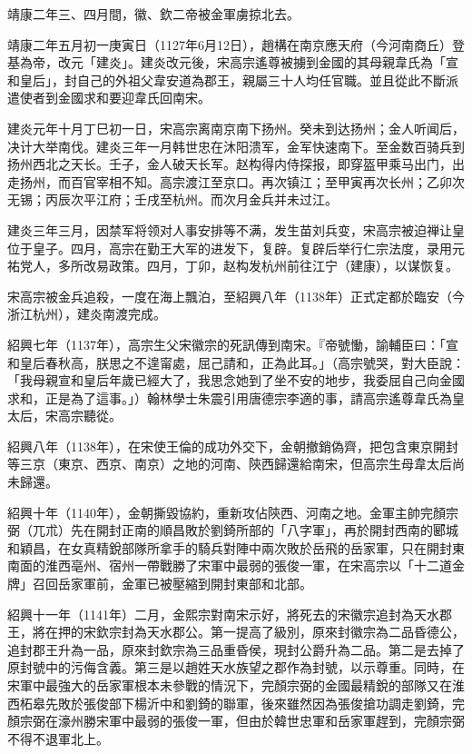 靖康二年三、四月間，徽、欽二帝被金軍虜掠北去。

靖康二年五月初一庚寅日（1127年6月12日），趙構在南京應天府（今河南商丘）登基為帝，改元「建炎」。建炎改元後，宋高宗遙尊被擄到金國的其母親韋氏為「宣和皇后」，封自己的外祖父韋安道為郡王，親屬三十人均任官職。並且從此不斷派遣使者到金國求和要迎韋氏回南宋。

建炎元年十月丁巳初一日，宋高宗离南京南下扬州。癸未到达扬州；金人听闻后，决计大举南伐。建炎三年一月韩世忠在沐阳溃军，金军快速南下。至金数百骑兵到扬州西北之天长。壬子，金人破天长军。赵构得内侍探报，即穿盔甲乘马出门，出走扬州，而百官宰相不知。高宗渡江至京口。再次镇江；至甲寅再次长州；乙卯次无锡；丙辰次平江府；壬戌至杭州。而次月金兵并未过江。

建炎三年三月，因禁军将领对人事安排等不满，发生苗刘兵变，宋高宗被迫禅让皇位于皇子。四月，高宗在勤王大军的进发下，复辟。复辟后举行仁宗法度，录用元祐党人，多所改易政策。四月，丁卯，赵构发杭州前往江宁（建康），以谋恢复。

宋高宗被金兵追殺，一度在海上飄泊，至紹興八年（1138年）正式定都於臨安（今浙江杭州），建炎南渡完成。

紹興七年（1137年），高宗生父宋徽宗的死訊傳到南宋。『帝號慟，諭輔臣曰：「宣和皇后春秋高，朕思之不遑甯處，屈己請和，正為此耳。」（高宗號哭，對大臣說：「我母親宣和皇后年歲已經大了，我思念她到了坐不安的地步，我委屈自己向金國求和，正是為了這事。」）翰林學士朱震引用唐德宗李適的事，請高宗遙尊韋氏為皇太后，宋高宗聽從。

紹興八年（1138年），在宋使王倫的成功外交下，金朝撤銷偽齊，把包含東京開封等三京（東京、西京、南京）之地的河南、陝西歸還給南宋，但高宗生母韋太后尚未歸還。

紹興十年（1140年），金朝撕毀協約，重新攻佔陝西、河南之地。金軍主帥完顏宗弼（兀朮）先在開封正南的順昌敗於劉錡所部的「八字軍」，再於開封西南的郾城和穎昌，在女真精銳部隊所拿手的騎兵對陣中兩次敗於岳飛的岳家軍，只在開封東南面的淮西亳州、宿州一帶戰勝了宋軍中最弱的張俊一軍，在宋高宗以「十二道金牌」召回岳家軍前，金軍已被壓縮到開封東部和北部。

紹興十一年（1141年）二月，金熙宗對南宋示好，將死去的宋徽宗追封為天水郡王，將在押的宋欽宗封為天水郡公。第一提高了級別，原來封徽宗為二品昏德公，追封郡王升為一品，原來封欽宗為三品重昏侯，現封公爵升為二品。第二是去掉了原封號中的污侮含義。第三是以趙姓天水族望之郡作為封號，以示尊重。同時，在宋軍中最強大的岳家軍根本未參戰的情況下，完顏宗弼的金國最精銳的部隊又在淮西柘皋先敗於張俊部下楊沂中和劉錡的聯軍，後來雖然因為張俊搶功調走劉錡，完顏宗弼在濠州勝宋軍中最弱的張俊一軍，但由於韓世忠軍和岳家軍趕到，完顏宗弼不得不退軍北上。

